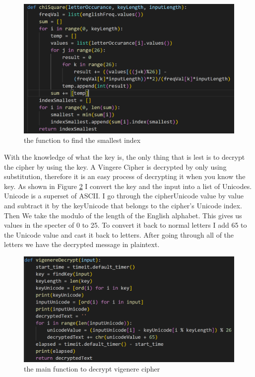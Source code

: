 \documentclass[12pt, letterpaper]{article}
\begin{document}
\begin{figure}[H]
  \includegraphics[width=\linewidth]{code_snippets/chiSquare.PNG}
  \caption{the function to find the smallest index}
  \label{fig:chiSquare}
\end{figure}

With the knowledge of what the key is, the only thing that is lest is to decrypt the cipher by using the key. A Vingere Cipher is decrypted by only using substitution, therefore it is an easy process of decrypting it when you know the key. As shown in Figure \ref{fig:vigenereDecrypt} I convert the key and the input into a list of Unicodes. Unicode is a superset of ASCII. I go through the cipherUnicode value by value and subtract it by the keyUnicode that belongs to the cipher's Unicode index. Then We take the modulo of the length of the English alphabet. This gives us values in the specter of 0 to 25. To convert it back to normal letters I add 65 to the Unicode value and cast it back to letters. After going through all of the letters we have the decrypted message in plaintext.

\begin{figure}[H]
  \includegraphics[width=\linewidth]{code_snippets/vigenereDecrypt.PNG}
  \caption{the main function to decrypt vigenere cipher}
  \label{fig:vigenereDecrypt}
\end{figure} 
\end{document}
